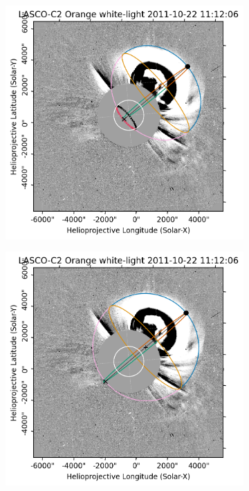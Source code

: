 \begin{figure}[htp]
	\centering
	\begin{subfigure}[b]{0.3\textwidth}
		\includegraphics[width=\textwidth]{chapter2/figs/Fig_s1.png}
	\end{subfigure}
	\hfill
	\begin{subfigure}[b]{0.3\textwidth}
		\includegraphics[width=\textwidth]{chapter2/figs/Fig_e1.png}

\end{subfigure}
\end{figure}
